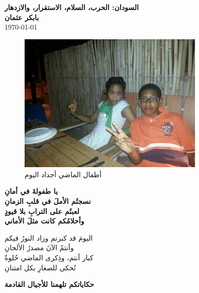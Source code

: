 \documentclass[12pt]{article}
\begin{document}
\begin{center}
    {\Huge\textbf{\textcolor{titleColor}{السودان: الحرب، السلام، الاستقرار، والازدهار}}} \\
    \vspace{0.5cm}
    \textbf{\textcolor{emphasisColor}{بابكر عثمان}} \\
    \vspace{0.2cm}
    \today
\end{center}

\begin{figure}
    \includegraphics[width=0.8\textwidth]{d9.jpg}
    \caption{\textcolor{sectionColor}{أطفال الماضي أجداد اليوم}}
\end{figure}

\begin{center}
\textbf{\textcolor{textHighlight}{
يا طفولةَ  في أمانِ \\
نسجتُم الأملَ في قلبِ الزمانِ \\
لعبتُم على الترابِ بلا قيودٍ \\
وأحلامُكم كانت مثلَ الأماني \\
}} 
\end{center}

\vspace{0.5cm}

\noindent
\textcolor{sectionColor}{
اليومَ قد كبرتم وزاد النورُ فيكم \\
وأنتمُ الآنَ مصدرُ الألحانِ \\
كبار  أنتم، وذِكرى الماضي حُلوةٌ \\
تُحكى للصغارِ بكل امتنانِ \\
}

\vspace{1cm}
\centering
\textbf{\textcolor{emphasisColor}{حكاياتكم تلهمنا للأجيال القادمة}}
\end{document}
